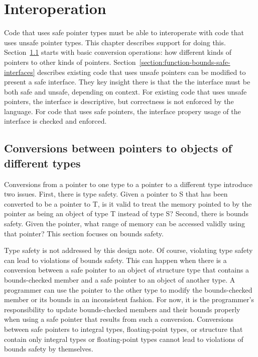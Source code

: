 
\newcommand{\boundscast}[2]{\texttt{bounds\_cast<#1>#2}}
\newcommand{\coreboundscast}[2]{\texttt{core\_bounds\_cast<#1>#2}}
\newcommand{\assumeboundscast}[2]{\texttt{assume\_bounds\_cast<#1>#2}}
\newcommand{\ptrcast}[2]{\texttt{bounds\_cast<#1>#2}}

\chapter{Interoperation}
\label{chapter:interoperation}

Code that uses safe pointer types must be able to interoperate with
code that uses unsafe pointer types.  This chapter describes support
for doing this.  Section~\ref{section:pointer-casting} starts with
basic conversion operations: how different kinds of pointers to
other kinds of pointers.  Section~\ref{section:function-bounds-safe-interfaces}
describes existing code that uses unsafe pointers can be modified
to present a safe interface.  They key insight there is that the
the interface must be both safe and unsafe, depending on context.
For existing code that uses unsafe pointers, the interface is descriptive,
but correctness is not enforced by the language.  For code that uses safe
pointers, the interface propery usage of the interface is checked
and enforced.

\section{Conversions between pointers to objects of different types}
\label{section:pointer-casting}

Conversions from a pointer to one type to a pointer to a different type
introduce two issues. First, there is type safety. Given a pointer to S
that has been converted to be a pointer to T, is it valid to treat the
memory pointed to by the pointer as being an object of type T instead of
type S? Second, there is bounds safety. Given the pointer, what range of
memory can be accessed validly using that pointer? This section focuses on
bounds safety.

Type safety is not addressed by this design note. Of course, violating
type safety can lead to violations of bounds safety. This can happen
when there is a conversion between a safe pointer to an object of
structure type that contains a bounds-checked member and a safe pointer
to an object of another type. A programmer can use the pointer to the
other type to modify the bounds-checked member or its bounds in an
inconsistent fashion. For now, it is the programmer's responsibility to
update bounds-checked members and their bounds properly when using a
safe pointer that results from such a conversion. Conversions between
safe pointers to integral types, floating-point types, or structure that
contain only integral types or floating-point types cannot lead to
violations of bounds safety by themselves.

